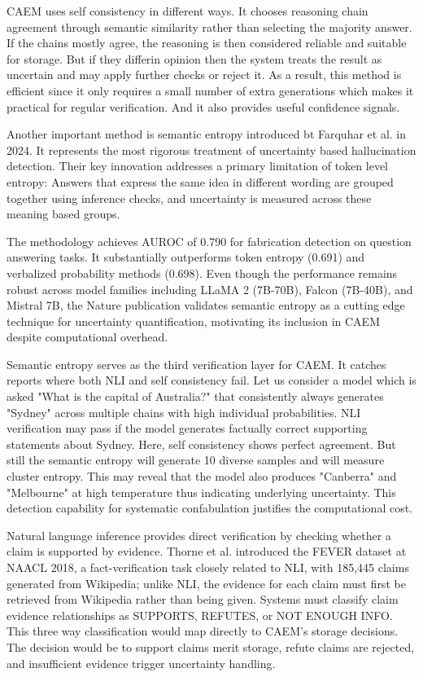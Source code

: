 CAEM uses self consistency in different ways. It chooses reasoning chain agreement through semantic similarity rather than selecting the majority answer. If the chains mostly agree, the reasoning is then considered reliable and suitable for storage. But if they differin opinion then the system treats the result as uncertain and may apply further checks or reject it. As a result, this method is efficient since it only requires a small number of extra generations which makes it practical for regular verification. And it also provides useful confidence signals.

Another important method is semantic entropy introduced bt Farquhar et al. \cite{farquhar2024semantic} in 2024. It represents the most rigorous treatment of uncertainty based hallucination detection. Their key innovation addresses a primary limitation of token level entropy: Answers that express the same idea in different wording are grouped together using inference checks, and uncertainty is measured across these meaning based groups.

The methodology achieves AUROC of 0.790 for fabrication detection on question answering tasks. It substantially outperforms token entropy (0.691) and verbalized probability methods (0.698). Even though the performance remains robust across model families including LLaMA 2 (7B-70B), Falcon (7B-40B), and Mistral 7B, the Nature publication validates semantic entropy as a cutting edge technique for uncertainty quantification, motivating its inclusion in CAEM despite computational overhead.

Semantic entropy serves as the third verification layer for CAEM. It catches reports where both NLI and self consistency fail. Let us consider a model which is asked "What is the capital of Australia?" that consistently always generates "Sydney" across multiple chains with high individual probabilities. NLI verification may pass if the model generates factually correct supporting statements about Sydney. Here, self consistency shows perfect agreement. But still the semantic entropy will generate 10 diverse samples and will measure cluster entropy. This may reveal that the model also produces "Canberra" and "Melbourne" at high temperature thus indicating underlying uncertainty. This detection capability for systematic confabulation justifies the computational cost.

Natural language inference provides direct verification by checking whether a claim is supported by evidence. Thorne et al. \cite{thorne-etal-2018-fever} introduced the FEVER dataset at NAACL 2018, a fact-verification task closely related to NLI, with 185,445 claims generated from Wikipedia; unlike NLI, the evidence for each claim must first be retrieved from Wikipedia rather than being given. Systems must classify claim evidence relationships as SUPPORTS, REFUTES, or NOT ENOUGH INFO. This three way classification would map directly to CAEM's storage decisions. The decision would be to support claims merit storage, refute claims are rejected, and insufficient evidence trigger uncertainty handling.

